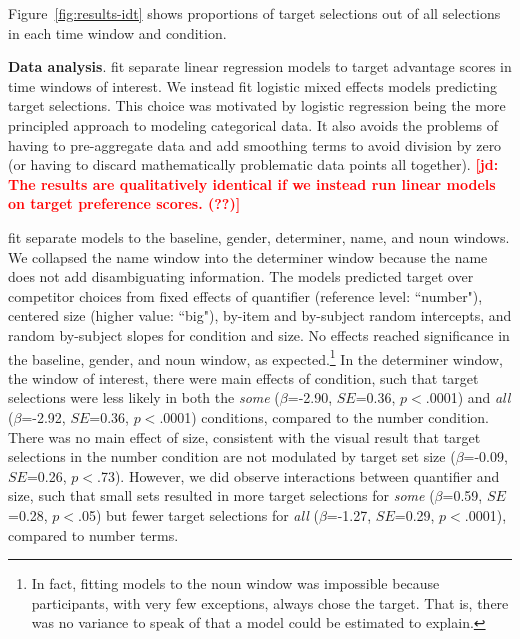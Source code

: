 \documentclass[10pt,letterpaper]{article}
\newcommand{\figref}[1]{Figure~\ref{#1}}
\newcommand{\jd}[1]{\textcolor{Red}{\textbf{[jd: #1]}}}
\begin{document}

\figref{fig:results-idt} shows proportions of target selections out of all selections in each time window and condition. 


\textbf{Data analysis}.  fit separate linear regression models to target advantage scores in time windows of interest. We instead fit logistic mixed effects models predicting target selections. This choice was motivated by logistic regression being the more principled approach to modeling categorical data. It also avoids the problems of having to pre-aggregate data and add smoothing terms to avoid division by zero (or having to discard mathematically problematic data points all together). \jd{The results are qualitatively identical if we instead run linear models on target preference scores. (??)}

 fit separate models to the baseline, gender, determiner, name, and noun windows. We collapsed the name window into the determiner window because the name does not add disambiguating information. The models predicted target over competitor choices from fixed effects of quantifier (reference level: ``number"), centered size (higher value: ``big"), by-item and by-subject random intercepts, and random by-subject slopes for condition and size. No effects reached significance in the baseline, gender, and noun window, as expected.\footnote{In fact, fitting models to the noun window was impossible because participants, with very few exceptions, always chose the target. That is, there was no variance to speak of that a model could be estimated to explain.}  In the determiner window, the window of interest, there were main effects of condition, such that target selections were less likely in both the \emph{some} ($\beta$=-2.90, $SE$=0.36, $p<$.0001) and \emph{all} ($\beta$=-2.92, $SE$=0.36, $p<$.0001) conditions, compared to the number condition. There was no main effect of size, consistent with the visual result that target selections in the number condition are not modulated by  target set size ($\beta$=-0.09, $SE$=0.26, $p<$.73). However, we did observe interactions between quantifier and size, such that small sets resulted in more target selections for \emph{some} ($\beta$=0.59, $SE$=0.28, $p<$.05) but fewer target selections for \emph{all} ($\beta$=-1.27, $SE$=0.29, $p<$.0001), compared to number terms. 
\end{document}
